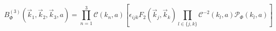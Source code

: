 

            \begin{equation}\label{}
                B^{(3)}_\Phi(\vec{k}_1,\vec{k}_2,\vec{k}_3, a) = \prod_{n=1}^3 \mathcal{C}(k_n, a) \left[\epsilon_{ijk}F_2(\vec{k}_j,\vec{k}_k)\prod_{l\in\{j,k\}}\mathcal{C}^{-2}(k_l,a)\mathcal{P}_\Phi(k_l,a)\right]
            \end{equation}




